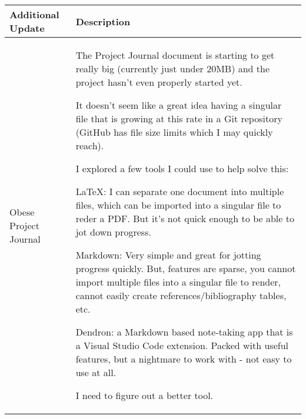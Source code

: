 \begin{table}[!h]
    \centering
    \begin{tabularx}{\textwidth}{|l|X|}
        \hline
        Additional Update & Description \\
        \hline
        \hline
        Obese Project Journal & 
        \begin{myitemize}
            \item The Project Journal document is starting to get really big (currently just under 20MB) and the project hasn't even properly started yet.
            \item It doesn't seem like a great idea having a singular file that is growing at this rate in a Git repository (GitHub has file size limits which I may quickly reach).
            \item I explored a few tools I could use to help solve this:
            \item \LaTeX: I can separate one document into multiple files, which can be imported into a singular file to reder a PDF. But it's not quick enough to be able to jot down progress.
            \item Markdown: Very simple and great for jotting progress quickly. But, features are sparse, you cannot import multiple files into a singular file to render, cannot easily create references/bibliography tables, etc.
            \item Dendron: a Markdown based note-taking app that is a Visual Studio Code extension. Packed with useful features, but a nightmare to work with - not easy to use at all.
            \item I need to figure out a better tool.
        \end{myitemize} \\
        \hline
    \end{tabularx}
\end{table}
